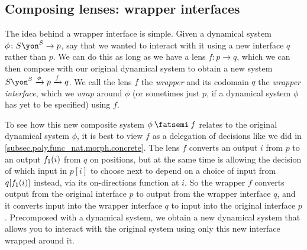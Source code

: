 \documentclass[Book-Poly]{subfiles}
\begin{document}
\subsection{Composing lenses: wrapper interfaces}\label{subsec.poly.dyn_sys.new.wrap}

The idea behind a wrapper interface is simple.
Given a dynamical system $\phi\colon S\yon^S\to p$, say that we wanted to interact with it using a new interface $q$ rather than $p$.
We can do this as long as we have a lens $f\colon p\to q$, which we can then compose with our original dynamical system to obtain a new system $S\yon^S\To{\phi}p\To{f}q$.
We call the lens $f$ the \emph{wrapper} and its codomain $q$ the \emph{wrapper interface}, which we \emph{wrap} around $\phi$ (or sometimes just $p$, if a dynamical system $\phi$ has yet to be specified) using $f$.

To see how this new composite system $\phi\then f$ relates to the original dynamical system $\phi$, it is best to view $f$ as a delegation of decisions like we did in \cref{subsec.poly.func_nat.morph.concrete}.
The lens $f$ converts an output $i$ from $p$ to an output $f_{\textsf{1}}(i)$ from $q$ on positions, but at the same time is allowing the decision of which input in $p[i]$ to choose next to depend on a choice of input from $q[f_{\textsf{1}}(i)]$ instead, via its on-directions function at $i$.
So the wrapper $f$ converts output from the original interface $p$ to output from the wrapper interface $q$, and it converts input into the wrapper interface $q$ to input into the original interface $p$.
Precomposed with a dynamical system, we obtain a new dynamical system that allows you to interact with the original system using only this new interface wrapped around it.
\end{document}

